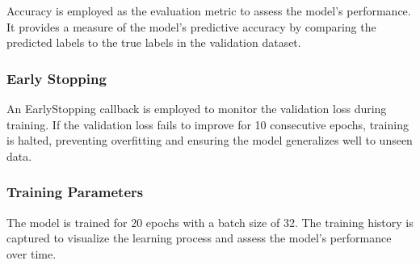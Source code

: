 Accuracy is employed as the evaluation metric to assess the model's performance. It provides a measure of the model's predictive accuracy by comparing the predicted labels to the true labels in the validation dataset.

\subsubsection{Early Stopping}

An EarlyStopping callback is employed to monitor the validation loss during training. If the validation loss fails to improve for 10 consecutive epochs, training is halted, preventing overfitting and ensuring the model generalizes well to unseen data.

\subsubsection{Training Parameters}

The model is trained for 20 epochs with a batch size of 32. The training history is captured to visualize the learning process and assess the model's performance over time.




